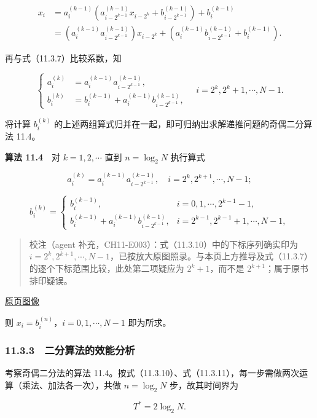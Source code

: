 \documentclass[
  10pt,
  fontset=fandol]{ctexart}
\begin{document}
\[
\begin{aligned}
x_i
&=a_i^{(k-1)}\left(a_{i-2^{k-1}}^{(k-1)}x_{i-2^k}+b_{i-2^{k-1}}^{(k-1)}\right)+b_i^{(k-1)}\\
&=\left(a_i^{(k-1)}a_{i-2^{k-1}}^{(k-1)}\right)x_{i-2^k}+\left(a_i^{(k-1)}b_{i-2^{k-1}}^{(k-1)}+b_i^{(k-1)}\right).
\end{aligned}
\]

再与式（11.3.7）比较系数，知

\[
\left\{
\begin{aligned}
a_i^{(k)}&=a_i^{(k-1)}a_{i-2^{k-1}}^{(k-1)},\\
b_i^{(k)}&=b_i^{(k-1)}+a_i^{(k-1)}b_{i-2^{k-1}}^{(k-1)},
\end{aligned}
\right.
\quad i=2^k,2^k+1,\cdots,N-1.
\]

将计算 \(b_i^{(k)}\) 的上述两组算式归并在一起，即可归纳出求解递推问题的奇偶二分算法 11.4。

\textbf{算法 11.4}　对 \(k=1,2,\cdots\) 直到 \(n=\log_2 N\) 执行算式

\[
a_i^{(k)}=a_i^{(k-1)}a_{i-2^{k-1}}^{(k-1)},\quad i=2^k,2^{k+1},\cdots,N-1;
\tag{11.3.10}
\]

\[
b_i^{(k)}=
\begin{cases}
b_i^{(k-1)},& i=0,1,\cdots,2^{k-1}-1,\\
b_i^{(k-1)}+a_i^{(k-1)}b_{i-2^{k-1}}^{(k-1)},& i=2^{k-1},2^{k-1}+1,\cdots,N-1,
\end{cases}
\tag{11.3.11}
\]

\begin{quote}
校注（agent 补充，CH11-E003）：式（11.3.10）中的下标序列确实印为 \(i=2^k,2^{k+1},\cdots,N-1\)，已按放大原图照录。与本页上方推导及式（11.3.7）的逐个下标范围比较，此处第二项疑应为 \(2^k+1\)，而不是 \(2^{k+1}\)；属于原书排印疑误。
\end{quote}

\href{../../source-images/pdf-288.jpeg}{原页图像}

则 \(x_i=b_i^{(n)}\)，\(i=0,1,\cdots,N-1\) 即为所求。

\subsubsection{11.3.3　二分算法的效能分析}\label{ux4e8cux5206ux7b97ux6cd5ux7684ux6548ux80fdux5206ux6790}

考察奇偶二分法的算法 11.4。按式（11.3.10）、式（11.3.11），每一步需做两次运算（乘法、加法各一次），共做 \(n=\log_2 N\) 步，故其时间界为

\[
T^*=2\log_2 N.
\]
\end{document}
